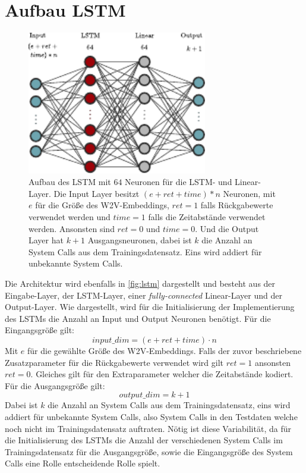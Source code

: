     \section{Aufbau LSTM}\label{sec:aufbau_lstm}
        \begin{figure}[ht]
            \centering
            \includegraphics[width=0.7\textwidth]{images/lstm.pdf}
            \caption{Aufbau des \ac{LSTM} mit $64$ Neuronen für die \ac{LSTM}- und Linear-Layer.
                Die Input Layer besitzt $(e + ret + time) * n$ Neuronen, mit $e$ für die Größe des \ac{W2V}-Embeddings,
                $ret=1$ falls Rückgabewerte verwendet werden und $time=1$ falls die Zeitabstände verwendet werden.
                Ansonsten sind $ret=0$ und $time=0$.
                Und die Output Layer hat $k+1$ Ausgangsneuronen, dabei ist $k$ die Anzahl an System Calls aus dem Trainingsdatensatz.
                Eins wird addiert für unbekannte System Calls.}
                \label{fig:lstm}
        \end{figure}

        Die Architektur wird ebenfalls in \autoref{fig:lstm} dargestellt und besteht aus der Eingabe-Layer, der \ac{LSTM}-Layer, einer \textit{fully-connected} Linear-Layer und der Output-Layer.
        Wie dargestellt, wird für die Initialisierung der Implementierung des \acp{LSTM} die Anzahl an Input und Output Neuronen benötigt.
        Für die Eingangsgröße gilt:
        \begin{equation}
            input\_dim = (e + ret + time) \cdot n
        \end{equation}
        Mit $e$ für die gewählte Größe des \ac{W2V}-Embeddings.
        Falls der zuvor beschriebene Zusatzparameter für die Rückgabewerte verwendet wird gilt $ret=1$ ansonsten $ret=0$.
        Gleiches gilt für den Extraparameter welcher die Zeitabstände kodiert.
        Für die Ausgangsgröße gilt:
        \begin{equation}
            output\_dim = k + 1
        \end{equation}
        Dabei ist $k$ die Anzahl an System Calls aus dem Trainingsdatensatz, eins wird addiert für unbekannte System Calls, also System Calls in den Testdaten welche noch nicht im Trainingsdatensatz auftraten.
        Nötig ist diese Variabilität, da für die Initialisierung des \acp{LSTM} die Anzahl der verschiedenen System Calls im Trainingsdatensatz für die Ausgangsgröße, sowie die Eingangsgröße des System Calls eine Rolle entscheidende Rolle spielt.

